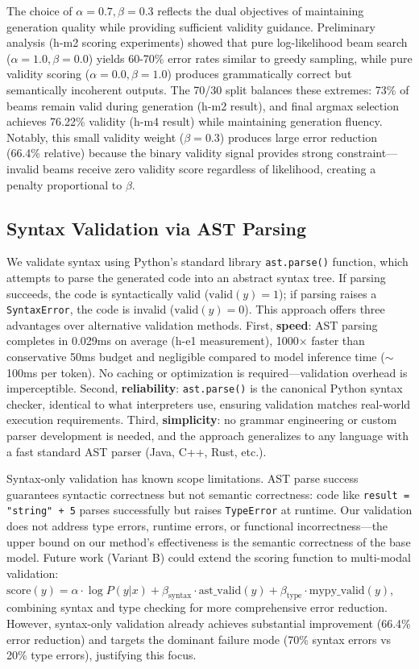 The choice of $\alpha=0.7, \beta=0.3$ reflects the dual objectives of maintaining generation quality while providing sufficient validity guidance. Preliminary analysis (h-m2 scoring experiments) showed that pure log-likelihood beam search ($\alpha=1.0, \beta=0.0$) yields 60-70\% error rates similar to greedy sampling, while pure validity scoring ($\alpha=0.0, \beta=1.0$) produces grammatically correct but semantically incoherent outputs. The 70/30 split balances these extremes: 73\% of beams remain valid during generation (h-m2 result), and final argmax selection achieves 76.22\% validity (h-m4 result) while maintaining generation fluency. Notably, this small validity weight ($\beta=0.3$) produces large error reduction (66.4\% relative) because the binary validity signal provides strong constraint---invalid beams receive zero validity score regardless of likelihood, creating a penalty proportional to $\beta$.

\subsection{Syntax Validation via AST Parsing}

We validate syntax using Python's standard library \texttt{ast.parse()} function, which attempts to parse the generated code into an abstract syntax tree. If parsing succeeds, the code is syntactically valid ($\text{valid}(y)=1$); if parsing raises a \texttt{SyntaxError}, the code is invalid ($\text{valid}(y)=0$). This approach offers three advantages over alternative validation methods. First, \textbf{speed}: AST parsing completes in 0.029ms on average (h-e1 measurement), 1000$\times$ faster than conservative 50ms budget and negligible compared to model inference time ($\sim$100ms per token). No caching or optimization is required---validation overhead is imperceptible. Second, \textbf{reliability}: \texttt{ast.parse()} is the canonical Python syntax checker, identical to what interpreters use, ensuring validation matches real-world execution requirements. Third, \textbf{simplicity}: no grammar engineering or custom parser development is needed, and the approach generalizes to any language with a fast standard AST parser (Java, C++, Rust, etc.).

Syntax-only validation has known scope limitations. AST parse success guarantees syntactic correctness but not semantic correctness: code like \texttt{result = "string" + 5} parses successfully but raises \texttt{TypeError} at runtime. Our validation does not address type errors, runtime errors, or functional incorrectness---the upper bound on our method's effectiveness is the semantic correctness of the base model. Future work (Variant B) could extend the scoring function to multi-modal validation: $\text{score}(y) = \alpha \cdot \log P(y | x) + \beta_{\text{syntax}} \cdot \text{ast\_valid}(y) + \beta_{\text{type}} \cdot \text{mypy\_valid}(y)$, combining syntax and type checking for more comprehensive error reduction. However, syntax-only validation already achieves substantial improvement (66.4\% error reduction) and targets the dominant failure mode (70\% syntax errors vs 20\% type errors), justifying this focus.

